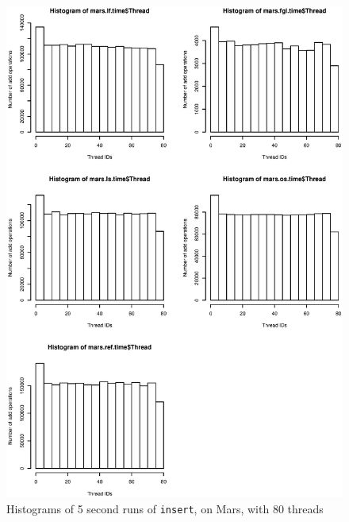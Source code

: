 \begin{figure}[H]
  \centering 
  \includegraphics[height=0.95\textheight]{pictures/mars_fairness_plot.eps}
  \caption{Histograms of 5 second runs of \texttt{insert}, on Mars, with 80 threads}
  \label{marsfairness}
\end{figure}

